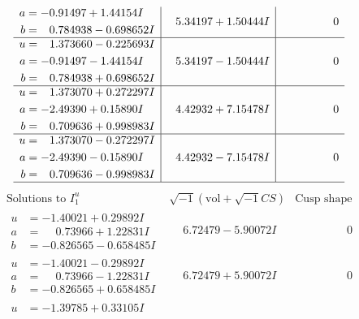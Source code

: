 \documentclass[1p]{elsarticle_modified}
\theoremstyle{definition}
\newcommand{\I}{\sqrt{-1}}
\begin{document}
$$\begin{array}{c|c|c}
\begin{aligned}
a &= -0.91497 + 1.44154 I \\
b &= \phantom{-}0.784938 - 0.698652 I\end{aligned}
 & \phantom{-}5.34197 + 1.50444 I & \phantom{-0.000000 } 0 \\ \hline\begin{aligned}
u &= \phantom{-}1.373660 - 0.225693 I \\
a &= -0.91497 - 1.44154 I \\
b &= \phantom{-}0.784938 + 0.698652 I\end{aligned}
 & \phantom{-}5.34197 - 1.50444 I & \phantom{-0.000000 } 0 \\ \hline\begin{aligned}
u &= \phantom{-}1.373070 + 0.272297 I \\
a &= -2.49390 + 0.15890 I \\
b &= \phantom{-}0.709636 + 0.998983 I\end{aligned}
 & \phantom{-}4.42932 + 7.15478 I & \phantom{-0.000000 } 0 \\ \hline\begin{aligned}
u &= \phantom{-}1.373070 - 0.272297 I \\
a &= -2.49390 - 0.15890 I \\
b &= \phantom{-}0.709636 - 0.998983 I\end{aligned}
 & \phantom{-}4.42932 - 7.15478 I & \phantom{-0.000000 } 0\\
 \hline 
 \end{array}$$\newpage$$\begin{array}{c|c|c}  
\text{Solutions to }I^u_{1}& \I (\text{vol} + \sqrt{-1}CS) & \text{Cusp shape}\\
 \hline 
\begin{aligned}
u &= -1.40021 + 0.29892 I \\
a &= \phantom{-}0.73966 + 1.22831 I \\
b &= -0.826565 - 0.658485 I\end{aligned}
 & \phantom{-}6.72479 - 5.90072 I & \phantom{-0.000000 } 0 \\ \hline\begin{aligned}
u &= -1.40021 - 0.29892 I \\
a &= \phantom{-}0.73966 - 1.22831 I \\
b &= -0.826565 + 0.658485 I\end{aligned}
 & \phantom{-}6.72479 + 5.90072 I & \phantom{-0.000000 } 0 \\ \hline\begin{aligned}
u &= -1.39785 + 0.33105 I \\

\end{aligned}
\end{array}$$
\end{document}
